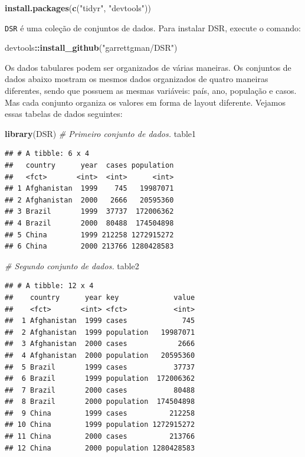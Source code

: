 \documentclass[]{book}
\newenvironment{Shaded}{\begin{snugshade}}{\end{snugshade}}
\newcommand{\CommentTok}[1]{\textcolor[rgb]{0.56,0.35,0.01}{\textit{#1}}}
\newcommand{\KeywordTok}[1]{\textcolor[rgb]{0.13,0.29,0.53}{\textbf{#1}}}
\newcommand{\NormalTok}[1]{#1}
\newcommand{\OperatorTok}[1]{\textcolor[rgb]{0.81,0.36,0.00}{\textbf{#1}}}
\newcommand{\StringTok}[1]{\textcolor[rgb]{0.31,0.60,0.02}{#1}}
\begin{document}
\begin{Shaded}
\begin{Highlighting}[]
\KeywordTok{install.packages}\NormalTok{(}\KeywordTok{c}\NormalTok{(}\StringTok{"tidyr"}\NormalTok{, }\StringTok{"devtools"}\NormalTok{))}
\end{Highlighting}
\end{Shaded}

\texttt{DSR} é uma coleção de conjuntos de dados. Para instalar DSR, execute o comando:

\begin{Shaded}
\begin{Highlighting}[]
\NormalTok{devtools}\OperatorTok{::}\KeywordTok{install_github}\NormalTok{(}\StringTok{"garrettgman/DSR"}\NormalTok{)}
\end{Highlighting}
\end{Shaded}

Os dados tabulares podem ser organizados de várias maneiras. Os conjuntos de dados abaixo mostram os mesmos dados organizados de quatro maneiras diferentes, sendo que possuem as mesmas variáveis: país, ano, população e casos. Mas cada conjunto organiza os valores em forma de layout diferente. Vejamos essas tabelas de dados seguintes:

\begin{Shaded}
\begin{Highlighting}[]
\KeywordTok{library}\NormalTok{(DSR)}
\CommentTok{# Primeiro conjunto de dados.}
\NormalTok{table1}
\end{Highlighting}
\end{Shaded}

\begin{verbatim}
## # A tibble: 6 x 4
##   country      year  cases population
##   <fct>       <int>  <int>      <int>
## 1 Afghanistan  1999    745   19987071
## 2 Afghanistan  2000   2666   20595360
## 3 Brazil       1999  37737  172006362
## 4 Brazil       2000  80488  174504898
## 5 China        1999 212258 1272915272
## 6 China        2000 213766 1280428583
\end{verbatim}

\begin{Shaded}
\begin{Highlighting}[]
\CommentTok{# Segundo conjunto de dados.}
\NormalTok{table2}
\end{Highlighting}
\end{Shaded}

\begin{verbatim}
## # A tibble: 12 x 4
##    country      year key             value
##    <fct>       <int> <fct>           <int>
##  1 Afghanistan  1999 cases             745
##  2 Afghanistan  1999 population   19987071
##  3 Afghanistan  2000 cases            2666
##  4 Afghanistan  2000 population   20595360
##  5 Brazil       1999 cases           37737
##  6 Brazil       1999 population  172006362
##  7 Brazil       2000 cases           80488
##  8 Brazil       2000 population  174504898
##  9 China        1999 cases          212258
## 10 China        1999 population 1272915272
## 11 China        2000 cases          213766
## 12 China        2000 population 1280428583
\end{verbatim}
\end{document}
